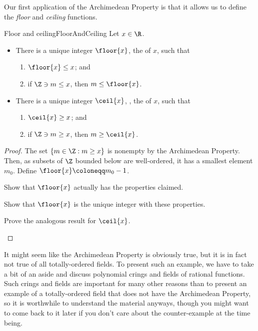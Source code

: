 Our first application of the Archimedean Property is that it allows us to define the \emph{floor} and \emph{ceiling} functions.
\begin{prp}{Floor and ceiling}{FloorAndCeiling}
Let $x\in \R$.
\begin{itemize}
\item There is a unique integer $\floor{x}$, the  of $x$, such that
\begin{enumerate}
\item $\floor{x}\leq x$; and
\item if $\Z \ni m\leq x$, then $m\leq \floor{x}$.
\end{enumerate}
\item There is a unique integer $\ceil{x}$, , the  of $x$, such that
\begin{enumerate}
\item $\ceil{x}\geq x$; and
\item if $\Z \ni m\geq x$, then $m\geq \ceil{x}$.
\end{enumerate}
\end{itemize}
\begin{proof}
The set $\{ m\in \Z :m\geq x\}$ is nonempty by the Archimedean Property.  Then, as subsets of $\Z$ bounded below are well-ordered, it has a smallest element $m_0$.  Define $\floor{x}\coloneqq m_0-1$.
\begin{exr}{}{}
Show that $\floor{x}$ actually has the properties claimed.
\end{exr}
\begin{exr}{}{}
Show that $\floor{x}$ is the unique integer with these properties.
\end{exr}
\begin{exr}{}{}
Prove the analogous result for $\ceil{x}$.
\end{exr}
\end{proof}
\end{prp}

It might seem like the Archimedean Property is obviously true, but it is in fact not true of all totally-ordered fields.  To present such an example, we have to take a bit of an aside and discuss polynomial crings and fields of rational functions.  Such crings and fields are important for many other reasons than to present an example of a totally-ordered field that does not have the Archimedean Property, so it is worthwhile to understand the material anyways, though you might want to come back to it later if you don't care about the counter-example at the time being.

